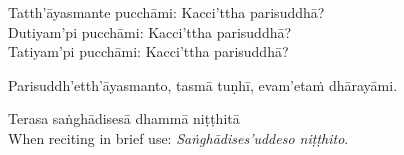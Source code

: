 \begin{center}
	\smallskip

	Tatth'āyasmante pucchāmi: Kacci'ttha parisuddhā?\\
	Dutiyam'pi pucchāmi: Kacci'ttha parisuddhā?\\
	Tatiyam'pi pucchāmi: Kacci'ttha parisuddhā?

	\smallskip

	Parisuddh'etth'āyasmanto, tasmā tuṇhī, evam'etaṁ dhārayāmi.
\end{center}

\begin{outro}
	Terasa saṅghādisesā dhammā niṭṭhitā\makeatletter\hyperlink{endnote11-appendix}\makeatother \thinspace\\
						When reciting in brief use: \textit{Saṅghādises'uddeso niṭṭhito}.\makeatletter\hyperlink{endnote113-appendix}\makeatother \thinspace
\end{outro}
\clearpage

